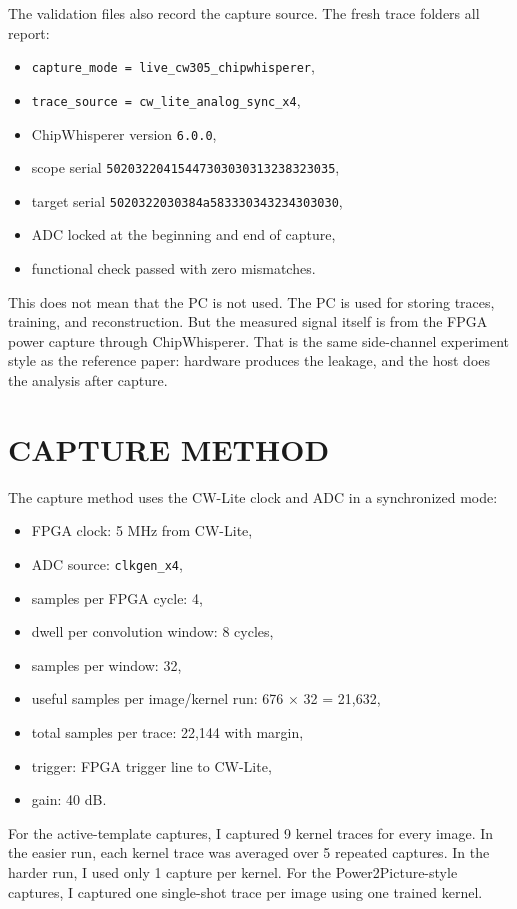 \documentclass[11pt]{article}
\begin{document}
The validation files also record the capture source. The fresh trace folders
all report:

\begin{itemize}
  \item \texttt{capture\_mode = live\_cw305\_chipwhisperer},
  \item \texttt{trace\_source = cw\_lite\_analog\_sync\_x4},
  \item ChipWhisperer version \texttt{6.0.0},
  \item scope serial \texttt{50203220415447303030313238323035},
  \item target serial \texttt{5020322030384a583330343234303030},
  \item ADC locked at the beginning and end of capture,
  \item functional check passed with zero mismatches.
\end{itemize}

This does not mean that the PC is not used. The PC is used for storing traces,
training, and reconstruction. But the measured signal itself is from the FPGA
power capture through ChipWhisperer. That is the same side-channel experiment
style as the reference paper: hardware produces the leakage, and the host does
the analysis after capture.

\section{CAPTURE METHOD}

The capture method uses the CW-Lite clock and ADC in a synchronized mode:

\begin{itemize}
  \item FPGA clock: 5 MHz from CW-Lite,
  \item ADC source: \texttt{clkgen\_x4},
  \item samples per FPGA cycle: 4,
  \item dwell per convolution window: 8 cycles,
  \item samples per window: 32,
  \item useful samples per image/kernel run: 676 $\times$ 32 = 21,632,
  \item total samples per trace: 22,144 with margin,
  \item trigger: FPGA trigger line to CW-Lite,
  \item gain: 40 dB.
\end{itemize}

For the active-template captures, I captured 9 kernel traces for every image.
In the easier run, each kernel trace was averaged over 5 repeated captures. In
the harder run, I used only 1 capture per kernel. For the Power2Picture-style
captures, I captured one single-shot trace per image using one trained kernel.
\end{document}
